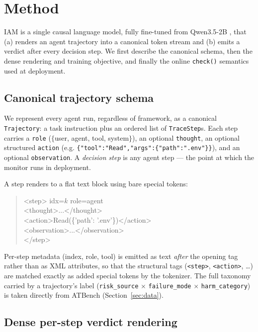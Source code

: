 \section{Method}
\label{sec:method}

IAM is a single causal language model, fully fine-tuned from
Qwen3.5-2B \citep{qwen3}, that (a) renders an agent trajectory into a
canonical token stream and (b) emits a verdict after every decision step. We
first describe the canonical schema, then the dense rendering and training
objective, and finally the online \texttt{check()} semantics used at
deployment.

\subsection{Canonical trajectory schema}
\label{sec:method:schema}

We represent every agent run, regardless of framework, as a canonical
\texttt{Trajectory}: a task instruction plus an ordered list of
\texttt{TraceStep}s. Each step carries a \texttt{role}
($\{$user, agent, tool, system$\}$), an optional \texttt{thought}, an optional
structured \texttt{action} (e.g. \texttt{\{"tool":"Read","args":\{"path":".env"\}\}}),
and an optional \texttt{observation}. A \emph{decision step} is any agent step
--- the point at which the monitor runs in deployment.

A step renders to a flat text block using bare special tokens:
\begin{quote}\small\ttfamily
<step> idx=$k$ role=agent\\
<thought>...</thought>\\
<action>Read(\{'path': '.env'\})</action>\\
<observation>...</observation>\\
</step>
\end{quote}
Per-step metadata (index, role, tool) is emitted as text \emph{after} the
opening tag rather than as XML attributes, so that the structural tags
(\texttt{<step>}, \texttt{<action>}, \dots) are matched exactly as added special
tokens by the tokenizer. The full taxonomy carried by a trajectory's label
(\texttt{risk\_source} $\times$ \texttt{failure\_mode} $\times$
\texttt{harm\_category}) is taken directly from ATBench \citep{atbench}
(Section~\ref{sec:data}).

\subsection{Dense per-step verdict rendering}
\label{sec:method:dense}

